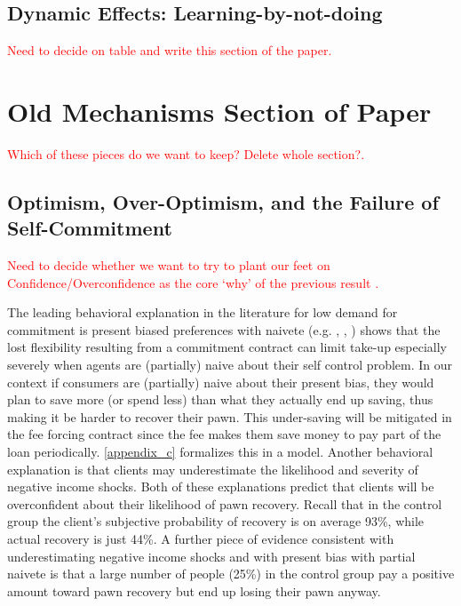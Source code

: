 \documentclass[oneside,11pt]{article}
\begin{document}
\subsection{Dynamic Effects:  Learning-by-not-doing}


\textcolor{red}{Need to decide on table and write this section of the paper.}














\section{Old Mechanisms Section of Paper}

\textcolor{red}{Which of these pieces do we want to keep?  Delete whole section?.}




\subsection{Optimism, Over-Optimism, and the Failure of Self-Commitment}
\label{overconfidence}

\textcolor{red}{Need to decide whether we want to try to plant our feet on Confidence/Overconfidence as the core `why' of the previous result
.}

The leading behavioral explanation in the literature for low demand for commitment is present biased preferences with naivete (e.g. \cite{Rabin2018}, \cite{John}, \cite{Laibson2018})  \cite{Laibson2015} shows that the lost flexibility resulting from a commitment contract can limit take-up especially severely when agents are (partially) naive about their self control problem. In our context if consumers are (partially) naive about their present bias, they would plan to save more (or spend less) than what they actually end up saving, thus making it be harder to recover their pawn. This under-saving will be mitigated in the fee forcing contract since the fee makes them save money to pay part of the loan periodically. \ref{appendix_c} formalizes this in a model. Another behavioral explanation is that clients may underestimate the likelihood and severity of negative income shocks. Both of these explanations predict that clients will be overconfident about their likelihood of pawn recovery. Recall that in the control group the client's subjective probability of recovery is on average 93\%, while actual recovery is just 44\%. A further piece of evidence consistent with underestimating negative income shocks and with present bias with partial naivete is that a large number of people (25\%) in the control group pay a positive amount toward pawn recovery but end up losing their pawn anyway.
\end{document}
